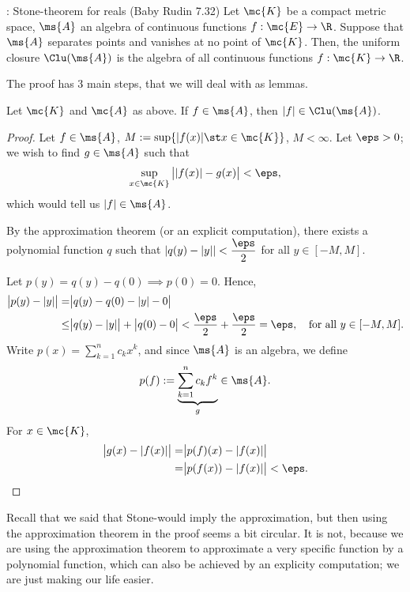 \begin{ntheorem}{: Stone-\Weierstass theorem for reals (Baby Rudin 7.32)}
    Let \(\mc{K}\) be a compact metric space, \(\ms{A}\) an algebra of continuous functions \(f:\mc{E}\to\R\). Suppose that \(\ms{A}\) separates points and vanishes at no point of \(\mc{K}\). Then, the uniform closure \(\Clu(\ms{A})\) is the algebra of all continuous functions \(f:\mc{K}\to\R\).
\end{ntheorem}
The proof has 3 main steps, that we will deal with as lemmas.
\begin{lemma}
    Let \(\mc{K}\) and \(\mc{A}\) as above. If \(f\in\ms{A}\), then \(|f|\in\Clu(\ms{A})\).
\end{lemma}
\begin{proof}
    Let \(f\in\ms{A}\), \(M:=\sup\{|f(x)|\st x\in\mc{K}\}\), \(M<\infty\). Let 
    \(\eps>0\); we wish to find \(g\in\ms{A}\) such that 
    \begin{equation*} 
        \sup_{x\in\mc{K}}\big||f(x)|-g(x)\big|<\eps,
    \end{equation*}
    which would tell us \(|f|\in\ms{A}\).

    \medskip

    By the \Weierstass approximation theorem (or an explicit computation), there exists a polynomial function \(q\) such that \(|q(y)-|y||<\displaystyle\frac{\eps}{2}\) for all \(y\in[-M,M]\).

    \smallskip

    Let \(p(y)=q(y)-q(0)\implies p(0)=0\). Hence,
    \begin{align*} 
        \big|p(y)-|y|\big|=&\big|q(y)-q(0)-|y|-0\big|\\
                       \leq&\big|q(y)-|y|\big|+\big|q(0)-0\big|<\frac{\eps}{2}+\frac{\eps}{2}=\eps,\quad\text{for all}~y\in[-M,M].
    \end{align*}        
    Write \(p(x)=\displaystyle\sum_{k=1}^n c_kx^k\), and since \(\ms{A}\) is an algebra, we define 
    \begin{equation*} 
        p(f):=\underbrace{\sum_{k=1}^n c_kf^k}_{g}\in\ms{A}.
    \end{equation*}
    For \(x\in\mc{K}\), 
    \begin{align*} 
        \big|g(x)-|f(x)|\big|=&\big|p(f)(x)-|f(x)|\big|\\
                             =&\big|p(f(x))-|f(x)|\big|<\eps.
    \end{align*}
\end{proof}
\begin{note}
    Recall that we said that Stone-\Weierstass would imply the \Weierstass approximation, but then using the approximation theorem in the proof seems a bit circular. It is not, because we are using the approximation theorem to approximate a very specific function by a polynomial function, which can also be achieved by an explicity computation; we are just making our life easier.
\end{note}
